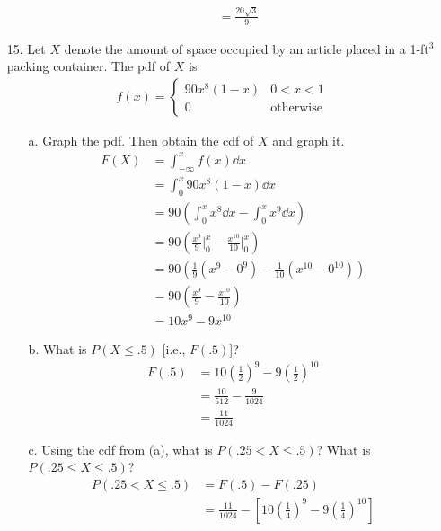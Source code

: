 \documentclass[letterpaper,12pt]{article}
\begin{document}
\begin{enumerate}
\begin{enumerate}
\begin{align*}
          &= \frac{20\sqrt{3}}{9}
        \end{align*}
    \end{enumerate}
  \item[15.]
    Let $X$ denote the amount of space occupied by an article placed in a 1-ft$^3$ packing container. The pdf of $X$ is
    \begin{align*}
      f(x) = \begin{cases}
        90x^8(1 - x) & 0 < x < 1 \\
        0            & \text{otherwise}
      \end{cases}
    \end{align*}
    \begin{enumerate}
      \item[a.]
        Graph the pdf. Then obtain the cdf of $X$ and graph it.
        \begin{align*}
          F(X) &= \int_{-\infty}^{x} f(x) \dd{x} \\
          &= \int_{0}^{x} 90x^8(1 - x) \dd{x} \\
          &= 90 \left(\int_{0}^{x} x^8 \dd{x} - \int_{0}^{x} x^9 \dd{x}\right) \\
          &= 90 \left(\frac{x^9}{9} \bigg\rvert_{0}^{x} - \frac{x^{10}}{10} \bigg\rvert_{0}^{x}\right) \\
          &= 90 \left(\frac{1}{9}(x^9 - 0^9) - \frac{1}{10}(x^{10} - 0^{10})\right) \\
          &= 90 \left(\frac{x^9}{9} - \frac{x^{10}}{10}\right) \\
          &= 10x^9 - 9x^{10}
        \end{align*}
      \item[b.]
        What is $P(X \le .5)$ [i.e., $F(.5)$]?
        \begin{align*}
          F(.5) &= 10\left(\frac{1}{2}\right)^9 - 9\left(\frac{1}{2}\right)^{10} \\
          &= \frac{10}{512} - \frac{9}{1024} \\
          &= \frac{11}{1024}
        \end{align*}
      \item[c.]
        Using the cdf from (a), what is $P(.25 < X \le .5)$? What is $P(.25 \le X \le .5)$?
        \begin{align*}
          P(.25 < X \le .5) &= F(.5) - F(.25) \\
          &= \frac{11}{1024} - \left[10\left(\frac{1}{4}\right)^9 - 9\left(\frac{1}{4}\right)^{10}\right] \\

\end{align*}
\end{enumerate}
\end{enumerate}
\end{document}
